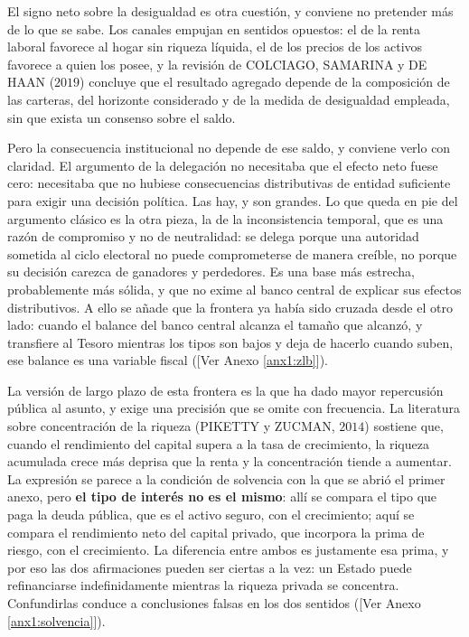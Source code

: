 \documentclass[10pt,a4paper]{article}
\newcommand{\authorfont}[1]{{\fontfamily{EBGaramond-TLF}\selectfont #1}}
\newcounter{anexo}
\begin{document}
El signo neto sobre la desigualdad es otra cuestión, y conviene no pretender más de lo que se sabe. Los canales empujan en sentidos opuestos: el de la renta laboral favorece al hogar sin riqueza líquida, el de los precios de los activos favorece a quien los posee, y la revisión de COLCIAGO, SAMARINA y DE HAAN ($2019$) concluye que el resultado agregado depende de la composición de las carteras, del horizonte considerado y de la medida de desigualdad empleada, sin que exista un consenso sobre el saldo.

Pero la consecuencia institucional no depende de ese saldo, y conviene verlo con claridad. El argumento de la delegación no necesitaba que el efecto neto fuese cero: necesitaba que no hubiese consecuencias distributivas de entidad suficiente para exigir una decisión política. Las hay, y son grandes. Lo que queda en pie del argumento clásico es la otra pieza, la de la inconsistencia temporal, que es una razón de compromiso y no de neutralidad: se delega porque una autoridad sometida al ciclo electoral no puede comprometerse de manera creíble, no porque su decisión carezca de ganadores y perdedores. Es una base más estrecha, probablemente más sólida, y que no exime al banco central de explicar sus efectos distributivos. A ello se añade que la frontera ya había sido cruzada desde el otro lado: cuando el balance del banco central alcanza el tamaño que alcanzó, y transfiere al Tesoro mientras los tipos son bajos y deja de hacerlo cuando suben, ese balance es una variable fiscal ([\authorfont{Ver Anexo \ref{anx1:zlb}}]).

La versión de largo plazo de esta frontera es la que ha dado mayor repercusión pública al asunto, y exige una precisión que se omite con frecuencia. La literatura sobre concentración de la riqueza (PIKETTY y ZUCMAN, $2014$) sostiene que, cuando el rendimiento del capital supera a la tasa de crecimiento, la riqueza acumulada crece más deprisa que la renta y la concentración tiende a aumentar. La expresión se parece a la condición de solvencia con la que se abrió el primer anexo, pero \textbf{el tipo de interés no es el mismo}: allí se compara el tipo que paga la deuda pública, que es el activo seguro, con el crecimiento; aquí se compara el rendimiento neto del capital privado, que incorpora la prima de riesgo, con el crecimiento. La diferencia entre ambos es justamente esa prima, y por eso las dos afirmaciones pueden ser ciertas a la vez: un Estado puede refinanciarse indefinidamente mientras la riqueza privada se concentra. Confundirlas conduce a conclusiones falsas en los dos sentidos ([\authorfont{Ver Anexo \ref{anx1:solvencia}}]).
\end{document}
